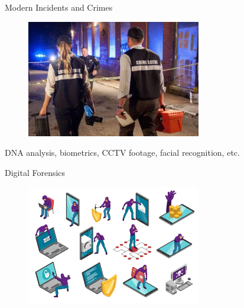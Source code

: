 \documentclass[handout]{beamer}
\begin{document}
\begin{frame}{Modern Incidents and Crimes}

\begin{figure}
   \includegraphics[width=3in]{figures/modern-incidents.jpeg}
\end{figure}

\pause
\footnotesize
DNA analysis, biometrics, CCTV footage, facial recognition, etc.

\end{frame}

\begin{frame}{Digital Forensics}

\begin{figure}
   \includegraphics[width=3in]{figures/digital-forensics.jpeg}
\end{figure}


\end{frame}
\end{document}
